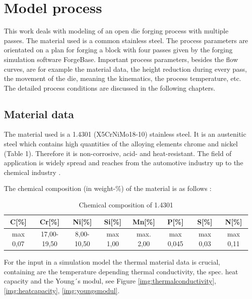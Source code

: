 \section{Model process}
This work deals with modeling of an open die forging process with multiple passes. The material used is a common stainless steel. The process parameters are orientated on a plan for forging a block with four passes given by the forging simulation software ForgeBase. Important process parameters, besides the flow curves, are for example the material data, the height reduction during every pass, the movement of the die, meaning the kinematics, the process temperature, etc. The detailed process conditions are discussed in the following chapters.\par

\subsection{Material data}
The material used is a 1.4301 (X5CrNiMo18-10) stainless steel. It is an austenitic steel which contains high quantities of the alloying elements chrome and nickel (Table 1). Therefore it is non-corrosive, acid- and heat-resistant. The field of application is widely spread and reaches from the automotive industry up to the chemical industry \cite{1.4301}.\par

The chemical composition (in weight-\%) of the material is as follows \cite{metallograf.de}:\begin{table}
 \centering
 \caption{Chemical composition of 1.4301}
 \begin{tabular}{|c|c|c|c|c|c|c|c|}
C[\%]&Cr[\%]&Ni[\%]&Si[\%]&Mn[\%]&P[\%]&S[\%]&N[\%]\\
 \hline
max 0,07&17,00-19,50&8,00-10,50&max 1,00&max. 2,00&max 0,045&max 0,03&max 0,11\\
 \end{tabular}
\end{table}\par

For the input in a simulation model the thermal material data is crucial, containing are the temperature depending thermal conductivity, the spec. heat capacity and the Young´s modul, see Figure \ref{img:thermalconductivity}, \ref{img:heatcapacity}, \ref{img:youngsmodul}.\par 

